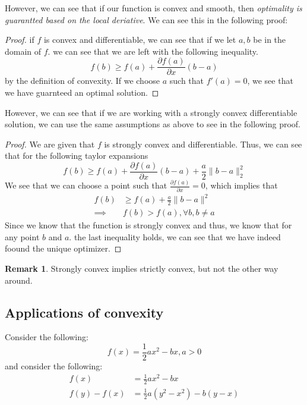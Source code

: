 \documentclass[11pt]{article}
\theoremstyle{definition}
\newtheorem{remark}{Remark}[section]
\begin{document}
However, we can see that if our function is convex and smooth, then \emph{optimality is guarantted based on the local deriative}. We can see this in the following proof:
\begin{proof}
  if $f$ is convex and differentiable, we can see that if we let $a,b$ be in the domain of $f$. we can see that we are left with the following inequality. 
  \[
  f(b) \geq f(a) + \frac{\partial f(a)}{\partial x}(b-a)
  \]
  by the definition of convexity. If we choose $a$ such that $f'(a) = 0$, we see that we have guarnteed an optimal solution. 
\end{proof}
However, we can see that if we are working with a strongly convex differentiable solution, we can use the same assumptions as above to see in the following proof. 
\begin{proof}
  We are given that $f$ is strongly convex and differentiable. Thus, we can see that for the following taylor expansions 
  \[
  f(b) \geq f(a) + \frac{\partial f(a)}{\partial x}(b-a) + \frac{a}{2} \|b - a\|_2^2
  \]
  We see that we can choose a point such that $\frac{\partial f(a)}{\partial x} = 0$, which implies that 
  \begin{align*}
    f(b) &\geq f(a) + \frac{a}{2} \|b - a\|^2\\
    \implies  & f(b)  > f(a), \forall b, b \neq a
  \end{align*}
  Since we know that the function is strongly convex and thus, we know that for any point $b$ and $a$. the last inequality holds, we can see that we have indeed foound the unique optimizer.
\end{proof}
\begin{remark}
  Strongly convex implies strictly convex, but not the other way around. 
\end{remark}
\subsection{Applications of convexity}
Consider the following:
\[
f(x) = \frac{1}{2} ax^2 - bx, a > 0
\]
and consider the following:
\begin{align*}
  f(x) &= \frac{1}{2}ax^2 - bx\\
  f(y) - f(x) &= \frac{1}{2}a(y^2 - x^2) - b(y-x)
\end{align*}
\end{document}
